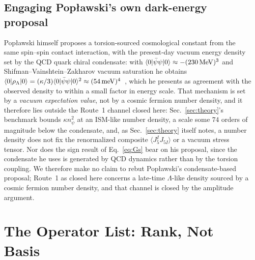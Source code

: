 \documentclass[aps,prd,twocolumn,superscriptaddress,preprintnumbers,nofootinbib,longbibliography,floatfix]{revtex4-2}
\begin{document}
\subsection{Engaging Pop{\l}awski's own dark-energy proposal}\label{sec:poplawski_de}
Pop{\l}awski himself proposes a torsion-sourced cosmological constant from the
same spin--spin contact interaction, with the present-day vacuum energy
density set by the QCD quark chiral condensate: with
$\langle0|\bar\psi\psi|0\rangle\approx-(230\,{\rm MeV})^3$ and
Shifman--Vainshtein--Zakharov vacuum saturation he obtains
$\langle0|\rho_\Lambda|0\rangle=(\kappa/3)\langle0|\bar\psi\psi|0\rangle^2
\approx(54\,{\rm meV})^4$~\cite{Poplawski2012}, which he presents as agreement
with the observed density to within a small factor in energy scale. That
mechanism is set by a \emph{vacuum expectation value}, not by a cosmic fermion
number density, and it therefore lies outside the Route~1 channel closed here:
Sec.~\ref{sec:theory}'s benchmark bounds
$\kappa n_\psi^2$ at an ISM-like number density, a scale some
$74$ orders of magnitude below the condensate, and, as
Sec.~\ref{sec:theory} itself notes, a number density does not fix the
renormalized composite $\langle J_5^IJ_{5I}\rangle$ or a vacuum stress tensor.
Nor does the sign result of Eq.~\eqref{eq:Gs} bear on his proposal, since the
condensate he uses is generated by QCD dynamics rather than by the torsion
coupling. We therefore make no claim to rebut Pop{\l}awski's condensate-based
proposal; Route~1 as closed here concerns a late-time $\Lambda$-like density
sourced by a cosmic fermion number density, and that channel is closed by the
amplitude argument.

\section{The Operator List: Rank, Not Basis}\label{sec:completeness}
\end{document}
